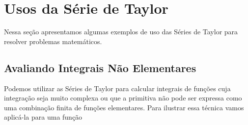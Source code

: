 \section{Usos da Série de Taylor}

Nessa seção apresentamos algumas exemplos de uso das Séries de Taylor para
resolver problemas matemáticos.

\subsection{Avaliando Integrais Não Elementares}

Podemos utilizar as Séries de Taylor para calcular integrais de funções
cuja integração seja muito complexa ou que a primitiva não pode ser expressa
como uma combinação finita de funções elementares.
Para ilustrar essa técnica vamos aplicá-la para uma função

